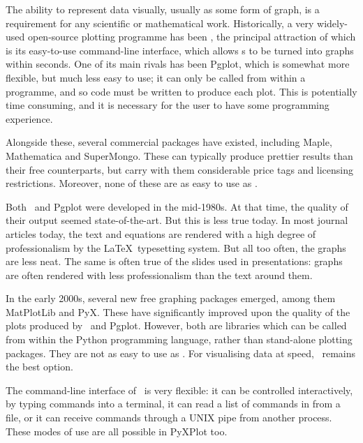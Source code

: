 The ability to represent data visually, usually as some form of graph, is a
requirement for any scientific or mathematical work.  Historically, a very
widely-used open-source plotting programme has been \gnuplot, the principal
attraction of which is its easy-to-use command-line interface, which allows
\datafile s to be turned into graphs within seconds. One of its main rivals has
been {\sc Pgplot}, which is somewhat more flexible, but much less
easy to use; it can only be called from within a programme, and so code must be
written to produce each plot.  This is potentially time consuming, and it is
necessary for the user to have some programming experience.

Alongside these, several commercial packages have existed, including {\sc
Maple}, {\sc Mathematica} and {\sc
SuperMongo}.  These can typically produce prettier results
than their free counterparts, but carry with them considerable price tags and
licensing restrictions. Moreover, none of these are as easy to use as \gnuplot.

Both \gnuplot\ and Pgplot were developed in the mid-1980s. At that time, the
quality of their output seemed state-of-the-art. But this is less true today.
In most journal articles today, the text and equations are rendered with a high
degree of professionalism by the \LaTeX\ typesetting system. But all too often,
the graphs are less neat.  The same is often true of the slides used in
presentations: graphs are often rendered with less professionalism than the
text around them.

In the early 2000s, several new free graphing packages emerged, among them {\sc
MatPlotLib} and {\sc PyX}.  These have
significantly improved upon the quality of the plots produced by \gnuplot\ and
Pgplot. However, both are libraries which can be called from within the Python
programming language, rather than stand-alone plotting packages. They are not
as easy to use as \gnuplot.  For visualising data at speed, \gnuplot\ remains the
best option.

The command-line interface of \gnuplot\ is very flexible: it can be controlled
interactively, by typing commands into a terminal, it can read a list of
commands in from a file, or it can receive commands through a UNIX pipe from
another process. These modes of use are all possible in PyXPlot too.

